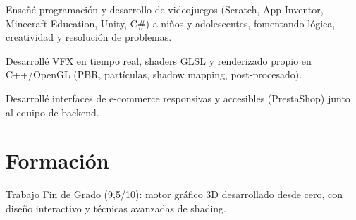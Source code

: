 \documentclass[10pt,a4paper]{article}
\begin{document}
\begin{cvitems}
  \item Ense\~n\'e programaci\'on y desarrollo de videojuegos (Scratch, App Inventor, Minecraft Education, Unity, C\#) a ni\~nos y adolescentes, fomentando l\'ogica, creatividad y resoluci\'on de problemas.
\end{cvitems}
\entrygap

\begin{cvitems}
  \item Desarroll\'e VFX en tiempo real, shaders GLSL y renderizado propio en C++/OpenGL (PBR, part\'iculas, shadow mapping, post-procesado).
\end{cvitems}
\entrygap

\begin{cvitems}
  \item Desarroll\'e interfaces de e-commerce responsivas y accesibles (PrestaShop) junto al equipo de backend.
\end{cvitems}

\section{Formaci\'on}
\begin{cvitems}
  \item Trabajo Fin de Grado (9,5/10): motor gr\'afico 3D desarrollado desde cero, con dise\~no interactivo y t\'ecnicas avanzadas de shading.
\end{cvitems}

\end{document}
